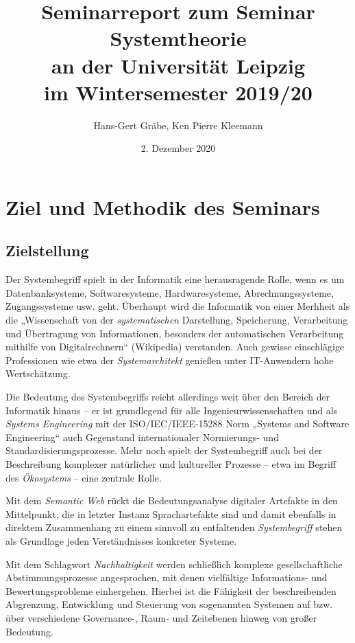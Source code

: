 \documentclass[11pt,a4paper]{article}
\title{Seminarreport zum Seminar Systemtheorie\\[6pt] an der Universität
  Leipzig\\ im Wintersemester 2019/20}
\author{Hans-Gert Gr\"abe, Ken Pierre Kleemann}
\date{2. Dezember 2020}
\begin{document}
\maketitle

\section{Ziel und Methodik des Seminars}

\subsection{Zielstellung}

Der Systembegriff spielt in der Informatik eine herausragende Rolle, wenn es
um Datenbanksysteme, Softwaresysteme, Hardwaresysteme, Abrechnungssysteme,
Zugangssysteme usw. geht.  Überhaupt wird die Informatik von einer Merhheit
als die „Wissenschaft von der \emph{systematischen} Darstellung, Speicherung,
Verarbeitung und Übertragung von Informationen, besonders der automatischen
Verarbeitung mithilfe von Digitalrechnern“ (Wikipedia) verstanden.  Auch
gewisse einschlägige Professionen wie etwa der \emph{Systemarchitekt} genießen
unter IT-Anwendern hohe Wertschätzung.

Die Bedeutung des Systembegriffs reicht allerdings weit über den Bereich der
Informatik hinaus -- er ist grundlegend für alle Ingenieurwissenschaften und
als \emph{Systems Engineering} mit der ISO/IEC/IEEE-15288 Norm „Systems and
Software Engineering“ auch Gegenstand internationaler Normierungs- und
Standardisierungsprozesse.  Mehr noch spielt der Systembegriff auch bei der
Beschreibung komplexer natürlicher und kultureller Prozesse -- etwa im Begriff
des \emph{Ökosystems} -- eine zentrale Rolle.

Mit dem \emph{Semantic Web} rückt die Bedeutungsanalyse digitaler Artefakte in
den Mittelpunkt, die in letzter Instanz Sprachartefakte sind und damit
ebenfalls in direktem Zusammenhang zu einem sinnvoll zu entfaltenden
\emph{Systembegriff} stehen als Grundlage jeden Verständnisses konkreter
Systeme.

Mit dem Schlagwort \emph{Nachhaltigkeit} werden schließlich komplexe
gesellschaftliche Abstimmungsprozesse angesprochen, mit denen vielfältige
Informations- und Bewertungsprobleme einhergehen. Hierbei ist die Fähigkeit
der beschreibenden Abgrenzung, Entwicklung und Steuerung von sogenannten
Systemen auf bzw. über verschiedene Governance-, Raum- und Zeitebenen hinweg
von großer Bedeutung.
\end{document}
